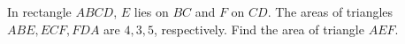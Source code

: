 In rectangle $ABCD$, $E$ lies on $BC$ and $F$ on $CD$. The areas of triangles $ABE,ECF,FDA$ are $4,3,5$, respectively. Find the area of triangle $AEF$.
